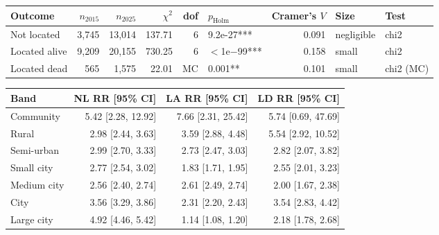 \begin{tabular}{lrrrrlrll}
\toprule
Outcome & $n_{2015}$ & $n_{2025}$ & $\chi^2$ & dof & $p_\mathrm{Holm}$ & Cramer's $V$ & Size & Test \\
\midrule
Not located & 3,745 & 13,014 & 137.71 & 6 & 9.2e-27*** & 0.091 & negligible & chi2 \\
Located alive & 9,209 & 20,155 & 730.25 & 6 & $<$1e$-$99*** & 0.158 & small & chi2 \\
Located dead & 565 & 1,575 & 22.01 & MC & 0.001** & 0.101 & small & chi2 (MC) \\
\bottomrule
\end{tabular}
\vspace{0.5em}

\begin{tabular}{lrrr}
\toprule
Band & NL RR [95\% CI] & LA RR [95\% CI] & LD RR [95\% CI] \\
\midrule
Community & 5.42 [2.28, 12.92] & 7.66 [2.31, 25.42] & 5.74 [0.69, 47.69] \\
Rural & 2.98 [2.44, 3.63] & 3.59 [2.88, 4.48] & 5.54 [2.92, 10.52] \\
Semi-urban & 2.99 [2.70, 3.33] & 2.73 [2.47, 3.03] & 2.82 [2.07, 3.82] \\
Small city & 2.77 [2.54, 3.02] & 1.83 [1.71, 1.95] & 2.55 [2.01, 3.23] \\
Medium city & 2.56 [2.40, 2.74] & 2.61 [2.49, 2.74] & 2.00 [1.67, 2.38] \\
City & 3.56 [3.29, 3.86] & 2.31 [2.20, 2.43] & 3.54 [2.83, 4.42] \\
Large city & 4.92 [4.46, 5.42] & 1.14 [1.08, 1.20] & 2.18 [1.78, 2.68] \\
\bottomrule
\end{tabular}
